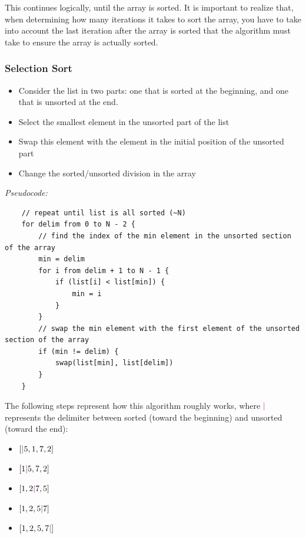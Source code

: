 \documentclass[12pt]{article}
\begin{document}
This continues logically, until the array is sorted. It is important to realize that, when determining how many iterations it takes to sort the array, you have to take into account the last iteration after the array is sorted that the algorithm must take to ensure the array is actually sorted.

\subsubsection{Selection Sort}
\begin{itemize}
    \item Consider the list in two parts: one that is sorted at the beginning, and one that is unsorted at the end.
    \item Select the smallest element in the unsorted part of the list
    \item Swap this element with the element in the initial position of the unsorted part
    \item Change the sorted/unsorted division in the array
\end{itemize}

\textit{Pseudocode:}

\begin{verbatim}
    // repeat until list is all sorted (~N)
    for delim from 0 to N - 2 {
        // find the index of the min element in the unsorted section of the array
        min = delim
        for i from delim + 1 to N - 1 {
            if (list[i] < list[min]) {
                min = i
            }
        }
        // swap the min element with the first element of the unsorted section of the array
        if (min != delim) {
            swap(list[min], list[delim])
        }
    }
\end{verbatim}

\newcommand{\blue}[1]{\textcolor{violet}{#1}}

The following steps represent how this algorithm roughly works, where $\blue{|}$ represents the delimiter between sorted (toward the beginning) and unsorted (toward the end):

\begin{itemize}
    \item $[\blue{|}5,1,7,2]$
    \item $[1\blue{|}5,7,2]$
    \item $[1,2\blue{|}7,5]$
    \item $[1,2,5\blue{|}7]$
    \item $[1,2,5,7\blue{|}]$
\end{itemize}
\end{document}
